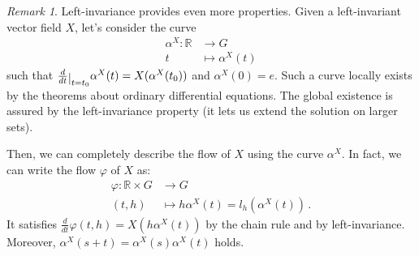 \documentclass[a4paper,11pt,titlepage, article, oneside]{memoir}
\numberwithin{equation}{section}
\theoremstyle{definition}
\theoremstyle{remark}
\newtheorem{remark}[theorem]{Remark}
\newcommand{\rfield}{\mathbb{R}}
\newcommand{\restrict}[2]{{#1}\raisebox{-.5ex}{$|$}_{#2}}
\newcommand{\diondi}[1]{\frac{d}{d{#1}}}
\begin{document}
\begin{remarkbox} \begin{remark} \label{alphacurve}
Left-invariance provides even more properties. Given a left-invariant vector field $X$, let's consider the curve
\begin{align}
\alpha^X \colon \rfield &\rightarrow G \\
t &\mapsto \alpha^X(t) \nonumber
\end{align}
such that $\restrict{\diondi{t}}{t=t_0} \alpha^X(t) = X(\alpha^X(t_0))$ and $\alpha^X(0)=e$. Such a curve locally exists by the theorems about ordinary differential equations. The global existence is assured by the left-invariance property (it lets us extend the solution on larger sets).

Then, we can completely describe the flow of $X$ using the curve $\alpha^X$. In fact, we can write the flow $\varphi$ of $X$ as:
\begin{align}
\varphi \colon \rfield \times G & \rightarrow G \\
(t, h) &\mapsto h \alpha^X(t) = l_h (\alpha^X(t)) \, . \nonumber
\end{align}
It satisfies $\diondi{t} \varphi(t, h) = X(h \alpha^X (t))$ by the chain rule and by left-invariance. Moreover, $\alpha^X(s+t) = \alpha^X(s) \alpha^X(t)$ holds.
\end{remark} \end{remarkbox}
\end{document}
